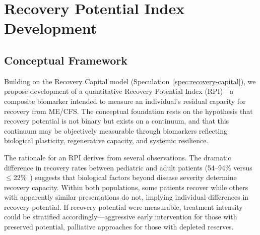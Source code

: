 \section{Recovery Potential Index Development}
\label{sec:recovery-potential-index}

\subsection{Conceptual Framework}

Building on the Recovery Capital model (Speculation~\ref{spec:recovery-capital}), we propose development of a quantitative Recovery Potential Index (RPI)---a composite biomarker intended to measure an individual's residual capacity for recovery from ME/CFS. The conceptual foundation rests on the hypothesis that recovery potential is not binary but exists on a continuum, and that this continuum may be objectively measurable through biomarkers reflecting biological plasticity, regenerative capacity, and systemic resilience.

The rationale for an RPI derives from several observations. The dramatic difference in recovery rates between pediatric and adult patients (54--94\% versus $\leq$22\%~\cite{Joyce1997prognosis, Rowe2019pediatric}) suggests that biological factors beyond disease severity determine recovery capacity. Within both populations, some patients recover while others with apparently similar presentations do not, implying individual differences in recovery potential. If recovery potential were measurable, treatment intensity could be stratified accordingly---aggressive early intervention for those with preserved potential, palliative approaches for those with depleted reserves.


